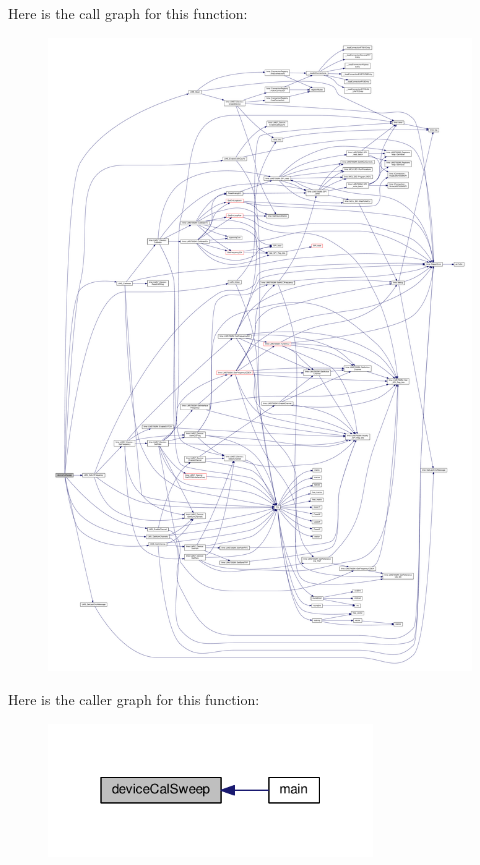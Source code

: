 Here is the call graph for this function\+:
\nopagebreak
\begin{figure}[H]
\begin{center}
\leavevmode
\includegraphics[width=350pt]{d0/d43/LimeUtilCalSweep_8cpp_aa1ddf17da91809067879ee6cf16f04d1_cgraph}
\end{center}
\end{figure}




Here is the caller graph for this function\+:
\nopagebreak
\begin{figure}[H]
\begin{center}
\leavevmode
\includegraphics[width=244pt]{d0/d43/LimeUtilCalSweep_8cpp_aa1ddf17da91809067879ee6cf16f04d1_icgraph}
\end{center}
\end{figure}


